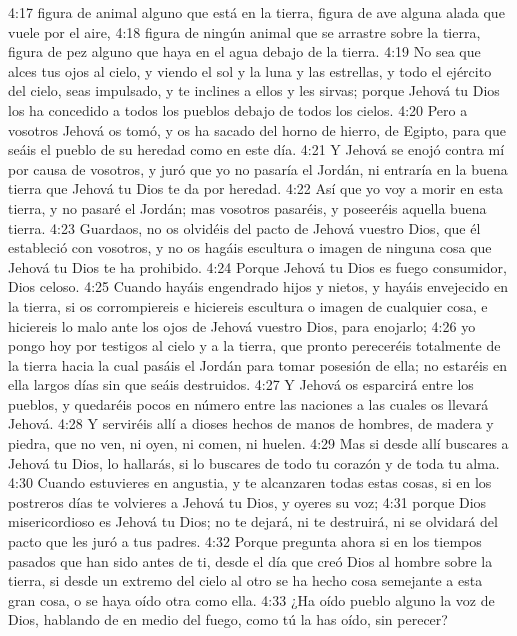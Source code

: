 4:17 figura de animal alguno que está en la tierra, figura de ave alguna alada que vuele por el aire,  
4:18 figura de ningún animal que se arrastre sobre la tierra, figura de pez alguno que haya en el agua debajo de la tierra.  
4:19 No sea que alces tus ojos al cielo, y viendo el sol y la luna y las estrellas, y todo el ejército del cielo, seas impulsado, y te inclines a ellos y les sirvas; porque Jehová tu Dios los ha concedido a todos los pueblos debajo de todos los cielos.  
4:20 Pero a vosotros Jehová os tomó, y os ha sacado del horno de hierro, de Egipto, para que seáis el pueblo de su heredad como en este día.  
4:21 Y Jehová se enojó contra mí por causa de vosotros, y juró que yo no pasaría el Jordán, ni entraría en la buena tierra que Jehová tu Dios te da por heredad.  
4:22 Así que yo voy a morir en esta tierra, y no pasaré el Jordán; mas vosotros pasaréis, y poseeréis aquella buena tierra.  
4:23 Guardaos, no os olvidéis del pacto de Jehová vuestro Dios, que él estableció con vosotros, y no os hagáis escultura o imagen de ninguna cosa que Jehová tu Dios te ha prohibido.  
4:24 Porque Jehová tu Dios es fuego consumidor, Dios celoso.  
4:25 Cuando hayáis engendrado hijos y nietos, y hayáis envejecido en la tierra, si os corrompiereis e hiciereis escultura o imagen de cualquier cosa, e hiciereis lo malo ante los ojos de Jehová vuestro Dios, para enojarlo;  
4:26 yo pongo hoy por testigos al cielo y a la tierra, que pronto pereceréis totalmente de la tierra hacia la cual pasáis el Jordán para tomar posesión de ella; no estaréis en ella largos días sin que seáis destruidos.  
4:27 Y Jehová os esparcirá entre los pueblos, y quedaréis pocos en número entre las naciones a las cuales os llevará Jehová.  
4:28 Y serviréis allí a dioses hechos de manos de hombres, de madera y piedra, que no ven, ni oyen, ni comen, ni huelen.  
4:29 Mas si desde allí buscares a Jehová tu Dios, lo hallarás, si lo buscares de todo tu corazón y de toda tu alma.  
4:30 Cuando estuvieres en angustia, y te alcanzaren todas estas cosas, si en los postreros días te volvieres a Jehová tu Dios, y oyeres su voz;  
4:31 porque Dios misericordioso es Jehová tu Dios; no te dejará, ni te destruirá, ni se olvidará del pacto que les juró a tus padres.  
4:32 Porque pregunta ahora si en los tiempos pasados que han sido antes de ti, desde el día que creó Dios al hombre sobre la tierra, si desde un extremo del cielo al otro se ha hecho cosa semejante a esta gran cosa, o se haya oído otra como ella.  
4:33 ¿Ha oído pueblo alguno la voz de Dios, hablando de en medio del fuego, como tú la has oído, sin perecer?  
